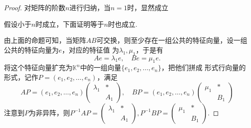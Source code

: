 \begin{proof}
	对矩阵的阶数$n$进行归纳，当$n=1$时，显然成立

	假设小于$n$时成立，下面证明等于$n$时也成立.

	由上面的命题可知，当矩阵$AB$可交换，则至少存在一组公共的特征向量，设一组公共的特征向量为$e$，对应的特征值
	为$\lambda_1,\mu_1$，于是有
	$$
		Ae = \lambda_1 e, \quad Be = \mu_1 e.
	$$
	将这个特征向量扩充为$\mathbb{K}^n$中的一组向量$\{ e_1, e_2,\dots, e_n \}$，把他们拼成
	形式行向量的形式，记作$P=(e_1, e_2, \dots, e_n)$，满足
	$$
		A P = (e_1, e_2, \dots, e_n) \begin{pmatrix}
			\lambda_1 & \ast \\
			& A_1
		\end{pmatrix}, \quad BP = (e_1, e_2, \dots, e_n) \begin{pmatrix}
			\mu_1 & \ast \\
			& B_1
		\end{pmatrix}
	$$
	注意到$P$为非异阵，则$P^{-1} A P =\begin{pmatrix}
		\lambda_1 & \ast \\
			& A_1
		\end{pmatrix}, P^{-1} B P = \begin{pmatrix}
			\mu_1 & \ast \\
			& B_1
		\end{pmatrix}$.
	

\end{proof}
